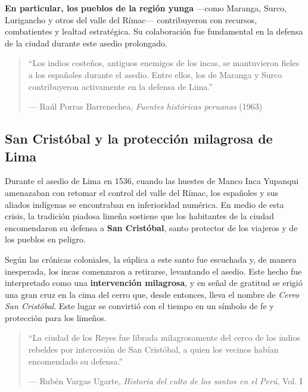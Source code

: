 \documentclass[a4paper,12pt]{article}
\begin{document}
\textbf{En particular, los pueblos de la región yunga} —como Maranga, Surco, Lurigancho y otros del valle del Rímac— contribuyeron con recursos, combatientes y lealtad estratégica. Su colaboración fue fundamental en la defensa de la ciudad durante este asedio prolongado.

\begin{quote}
	“Los indios costeños, antiguos enemigos de los incas, se mantuvieron fieles a los españoles durante el asedio. Entre ellos, los de Maranga y Surco contribuyeron activamente en la defensa de Lima.”
	\begin{flushright}
		— Raúl Porras Barrenechea, \textit{Fuentes históricas peruanas} (1963)
	\end{flushright}
\end{quote}

\clearpage
\subsection*{San Cristóbal y la protección milagrosa de Lima}

Durante el asedio de Lima en 1536, cuando las huestes de Manco Inca Yupanqui amenazaban con retomar el control del valle del Rímac, los españoles y sus aliados indígenas se encontraban en inferioridad numérica. En medio de esta crisis, la tradición piadosa limeña sostiene que los habitantes de la ciudad encomendaron su defensa a \textbf{San Cristóbal}, santo protector de los viajeros y de los pueblos en peligro.

Según las crónicas coloniales, la súplica a este santo fue escuchada y, de manera inesperada, los incas comenzaron a retirarse, levantando el asedio. Este hecho fue interpretado como una \textbf{intervención milagrosa}, y en señal de gratitud se erigió una gran cruz en la cima del cerro que, desde entonces, lleva el nombre de \textit{Cerro San Cristóbal}. Este lugar se convirtió con el tiempo en un símbolo de fe y protección para los limeños.

\begin{quote}
	“La ciudad de los Reyes fue librada milagrosamente del cerco de los indios rebeldes por intercesión de San Cristóbal, a quien los vecinos habían encomendado su defensa.”
	\begin{flushright}
		— Rubén Vargas Ugarte, \textit{Historia del culto de los santos en el Perú}, Vol. I
	\end{flushright}
\end{quote}
\end{document}
